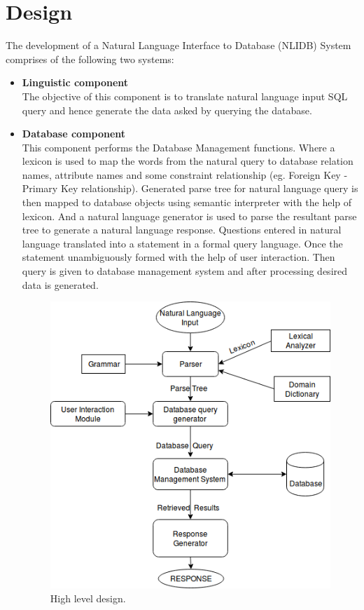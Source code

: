 \chapter{Design}





The development of a Natural Language Interface to Database (NLIDB) System comprises of the following two systems\cite{eight}:

\begin{itemize}

\item \textbf{Linguistic component}\\
The objective of this component is to translate natural language input SQL query and hence generate the data asked by querying the database.

\item \textbf{Database component}\\
This component performs the Database Management functions. Where a lexicon is used to map the words from the natural query to database relation names, attribute names and some constraint relationship (eg. Foreign Key - Primary Key relationship). Generated parse tree for natural language query is then mapped to database objects using semantic interpreter with the help of lexicon. And a natural language generator is used to parse the resultant parse tree to generate a natural language response. Questions entered in natural language translated into a statement in a formal query language. Once the statement unambiguously formed with the help of user interaction. Then query is given to database management system and after processing desired data is generated.

\begin{figure}[htp]
\center
\includegraphics[width=0.5\columnwidth]{newHLL}
\caption{High level design.}
\label{fig:High level design}
\end{figure}


\end{itemize}
